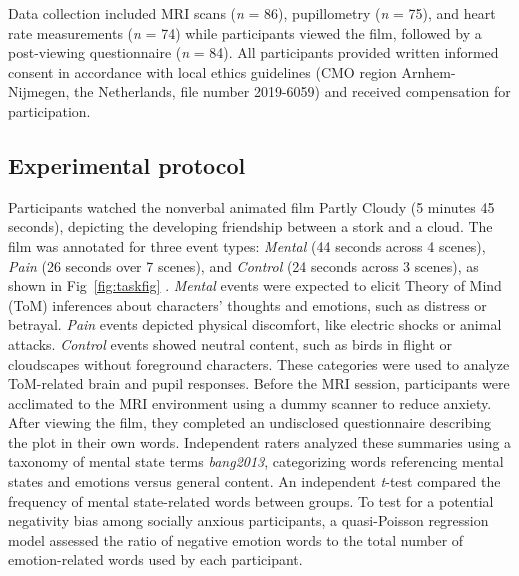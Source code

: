 Data collection included MRI scans (\textit{n} = 86), pupillometry (\textit{n} = 75), and heart rate measurements (\textit{n} = 74) while participants viewed the film, followed by a post-viewing questionnaire (\textit{n} = 84). All participants provided written informed consent in accordance with local ethics guidelines (CMO region Arnhem-Nijmegen, the Netherlands, file number 2019-6059) and received compensation for participation.


\subsection*{Experimental protocol}
Participants watched the nonverbal animated film Partly Cloudy (5 minutes 45 seconds), depicting the developing friendship between a stork and a cloud. The film was annotated for three event types: \textit{Mental} (44 seconds across 4 scenes), \textit{Pain} (26 seconds over 7 scenes), and \textit{Control} (24 seconds across 3 scenes), as shown in Fig~\ref{fig:taskfig} \citep{jacoby2016}. \textit{Mental} events were expected to elicit Theory of Mind (ToM) inferences about characters' thoughts and emotions, such as distress or betrayal. \textit{Pain} events depicted physical discomfort, like electric shocks or animal attacks. \textit{Control} events showed neutral content, such as birds in flight or cloudscapes without foreground characters. These categories were used to analyze ToM-related brain and pupil responses. Before the MRI session, participants were acclimated to the MRI environment using a dummy scanner to reduce anxiety. After viewing the film, they completed an undisclosed questionnaire describing the plot in their own words. Independent raters analyzed these summaries using a taxonomy of mental state terms \textit{bang2013}, categorizing words referencing mental states and emotions versus general content. An independent \textit{t}-test compared the frequency of mental state-related words between groups. To test for a potential negativity bias among socially anxious participants, a quasi-Poisson regression model assessed the ratio of negative emotion words to the total number of emotion-related words used by each participant.

